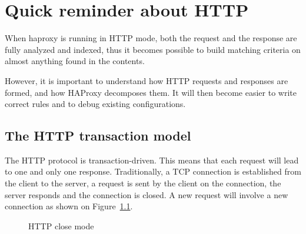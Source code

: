 \chapter{Quick reminder about HTTP}
\label{chap:http_reminder}

When haproxy is running in HTTP mode, both the request and the response are
fully analyzed and indexed, thus it becomes possible to build matching criteria
on almost anything found in the contents.

However, it is important to understand how HTTP requests and responses are
formed, and how HAProxy decomposes them. It will then become easier to write
correct rules and to debug existing configurations.

\section{The HTTP transaction model}
\label{sec:http_transaction}

The HTTP protocol is transaction-driven. This means that each request will lead
to one and only one response. Traditionally, a TCP connection is established
from the client to the server, a request is sent by the client on the
connection, the server responds and the connection is closed. A new request
will involve a new connection as shown on Figure~\ref{fig:http_close}.

\begin{figure}[!ht]
\centering
{}

\caption{HTTP close mode}
\label{fig:http_close}
\end{figure}


